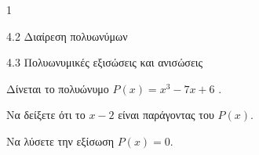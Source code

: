 \begin{ylh}{1}
\item 4.2 Διαίρεση πολυωνύμων
\item 4.3 Πολυωνυμικές εξισώσεις και ανισώσεις
\end{ylh}
Δίνεται το πολυώνυμο $P(x) = x^3 - 7x + 6$ .
\begin{alist}
\item Να δείξετε ότι το $x - 2$ είναι παράγοντας του $P(x)$.
\item Να λύσετε την εξίσωση $P(x) = 0$.
\end{alist}


